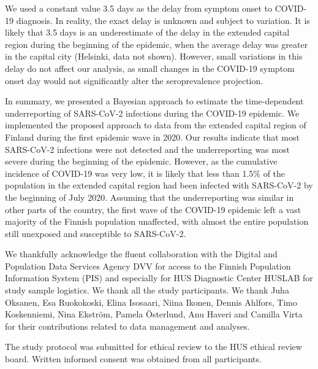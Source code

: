 \documentclass[aoas]{imsart}
\begin{document}
We used a constant value 3.5 days as the delay from symptom onset to COVID-19 diagnosis. In reality, the exact delay is unknown and subject to variation. It is likely that 3.5 days is an underestimate of the delay in the extended capital region during the beginning of the epidemic, when the average delay was greater in the capital city (Helsinki, data not shown). However, small variations in this delay do not affect our analysis, as small changes in the COVID-19 symptom onset day would not significantly alter the seroprevalence projection. 

In summary, we presented a Bayesian approach to estimate the time-dependent underreporting of SARS-CoV-2 infections during the COVID-19 epidemic. We implemented the proposed approach to data from the extended capital region of Finland during the first epidemic wave in 2020. Our results indicate that most SARS-CoV-2 infections were not detected and the underreporting was most severe during the beginning of the epidemic. However, as the cumulative incidence of COVID-19 was very low, it is likely that less than 1.5\% of the population in the extended capital region had been infected with SARS-CoV-2 by the beginning of July 2020. Assuming that the underreporting was similar in other parts of the country, the first wave of the COVID-19 epidemic left a vast majority of the Finnish population unaffected, with almost the entire population still unexposed and susceptible to SARS-CoV-2.




\begin{acks}[Acknowledgments]

We thankfully acknowledge the fluent collaboration with the Digital and Population Data Services Agency DVV for access to the Finnish Population Information System (PIS) and especially for HUS Diagnostic Center HUSLAB for study sample logistics. We thank all the study participants. We thank Juha Oksanen, Esa Ruokokoski, Elina Isosaari, Niina Ikonen, Dennis Ahlfors, Timo Koskenniemi, Nina Ekström, Pamela Österlund, Anu Haveri and Camilla Virta for their contributions related to data management and analyses. 

The study protocol was submitted for ethical review to the HUS ethical review board. Written informed consent was obtained from all participants.


\end{acks}
\end{document}

